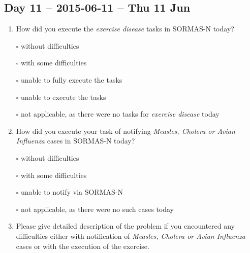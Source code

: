 \documentclass[a4paper, titlepage]{tufte-handout}
\begin{document}
\subsection{Day 11 -- 2015-06-11 -- Thu 11 Jun}
\label{sec-8-9}
\begin{enumerate}
\item How did you execute the \emph{exercise disease} tasks in SORMAS-N today?

\quad $\square$ without difficulties

\quad $\square$ with some difficulties

\quad $\square$ unable to fully execute the tasks

\quad $\square$ unable to execute the tasks

\quad $\square$ not applicable, as there were no tasks for \emph{exercise disease} today

\item How did you execute your task of notifying \emph{Measles, Cholera or Avian Influenza} cases in SORMAS-N today?

\quad $\square$ without difficulties

\quad $\square$ with some difficulties

\quad $\square$ unable to notify via SORMAS-N

\quad $\square$ not applicable, as there were no such cases today

\item Please give detailed description of the problem if you encountered any difficulties either with notification of \emph{Measles, Cholera or Avian Influenza} cases or with the execution of the exercise.

\hrulefill

\hrulefill

\hrulefill

\hrulefill

\hrulefill

\hrulefill

\hrulefill

\hrulefill

\hrulefill

\hrulefill
\end{enumerate}

\newpage
\end{document}

